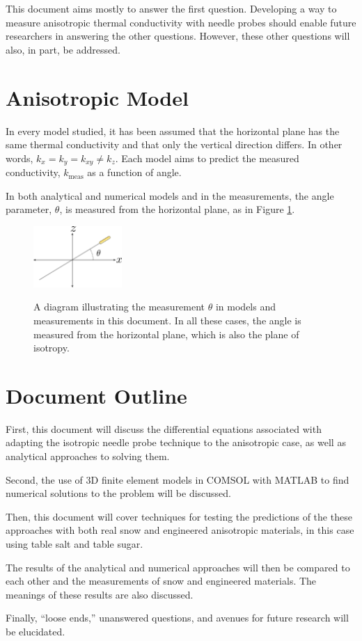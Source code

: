 This document aims mostly to answer the first question. Developing a way
to measure anisotropic thermal conductivity with needle probes should enable
future researchers in answering the other questions. However, these other
questions will also, in part, be addressed.

\section{Anisotropic Model}

In every model studied, it has been assumed that the horizontal plane has the
same thermal conductivity and that only the vertical direction differs. In other
words, \(k_x = k_y = k_{xy} \ne k_z\). Each model aims to predict the measured
conductivity, \(k_{\textrm{meas}}\) as a function of angle.

In both analytical and numerical models and in the measurements, the angle
parameter, \(\theta\), is measured from the horizontal plane, as in Figure 
\ref{fig:angle}.

\begin{figure}[h]
\centering
\includegraphics[width=0.3\textwidth]{fig/angle.png}
\label{fig:angle}
\caption{A diagram illustrating the measurement \(\theta\) in models and
measurements in this document. In all these cases, the angle is measured from
the horizontal plane, which is also the plane of isotropy. }
\end{figure}


\section{Document Outline}

First, this document will discuss the differential equations associated with
adapting the isotropic needle probe technique to the anisotropic case, as well
as analytical approaches to solving them. 

Second, the use of 3D finite element models in COMSOL with MATLAB to find 
numerical solutions to the problem will be discussed.

Then, this document will cover techniques for testing the predictions of the
these approaches with both real snow and engineered anisotropic materials, in
this case using table salt and table sugar.

The results of the analytical and numerical approaches will then be compared to
each other and the measurements of snow and engineered materials. The meanings
of these results are also discussed.

Finally, ``loose ends,'' unanswered questions, and avenues for future research
will be elucidated.
